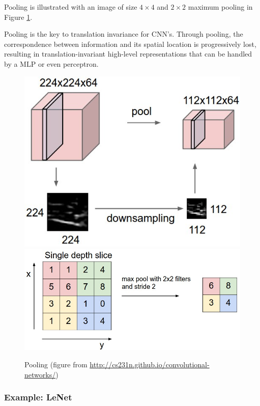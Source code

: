 \documentclass{article}
\begin{document}
Pooling is illustrated with an image of size $4 \times 4$ and $2 \times 2$ maximum pooling in Figure \ref{pool}.

Pooling is the key to translation invariance for CNN's.
Through pooling, the correspondence between information and its spatial location is progressively lost, resulting in translation-invariant high-level representations that can be handled by a MLP or even perceptron.

\begin{figure}
\includegraphics[scale=0.2]{pool}
\includegraphics[scale=0.2]{maxpool}
\caption{Pooling (figure from \url{http://cs231n.github.io/convolutional-networks/})}
\label{pool}
\end{figure}

\subsubsection{Example: LeNet}
\end{document}
